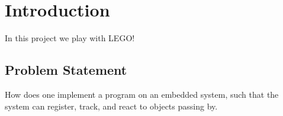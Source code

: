 \chapter{Introduction}\label{ch:introduction}\label{\automlabel}
In this project we play with LEGO! 
\eal

\section{Problem Statement}\label{sec:problemstatement}\label{\automlabel}

How does one implement a program on an embedded system, such that the system can register, track, and react to objects passing by.

\eal
